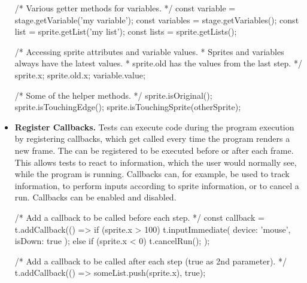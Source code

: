 \begin{itemize}
\begin{javascriptcode}
            /* Various getter methods for variables. */
            const variable = stage.getVariable('my variable');
            const variables = stage.getVariables();
            const list = sprite.getList('my list');
            const lists = sprite.getLists();

            /* Accessing sprite attributes and variable values.
             * Sprites and variables always have the latest values.
             * sprite.old has the values from the last step. */
            sprite.x;
            sprite.old.x;
            variable.value;

            /* Some of the helper methods. */
            sprite.isOriginal();
            sprite.isTouchingEdge();
            sprite.isTouchingSprite(otherSprite);
        \end{javascriptcode}
    \item \textbf{Register Callbacks.}
        Tests can execute code during the program execution by registering callbacks, which get called every time the program renders a new frame.
        The can be registered to be executed before or after each frame.
        This allows tests to react to information, which the user would normally see, while the program is running.
        Callbacks can, for example, be used to track information, to perform inputs according to sprite information, or to cancel a run.
        Callbacks can be enabled and disabled.
        \begin{javascriptcode}
            /* Add a callback to be called before each step. */
            const callback = t.addCallback(() => {
                if (sprite.x > 100) {
                    t.inputImmediate({ device: 'mouse', isDown: true });
                } else if (sprite.x < 0) {
                    t.cancelRun();
                }
            });

            /* Add a callback to be called after each step (true as 2nd parameter). */
            t.addCallback(() => someList.push(sprite.x), true);


\end{javascriptcode}
\end{itemize}
